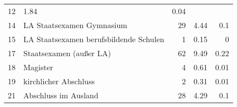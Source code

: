 \begin{longtable}{lXrrr}
       \num{12} &
       \num[round-mode=places,round-precision=2]{1.84} &
         \num[round-mode=places,round-precision=2]{0.04} \\

     14 &
     \multicolumn{1}{X}{ LA Staatsexamen Gymnasium   } &


       \num{29} &
       \num[round-mode=places,round-precision=2]{4.44} &
         \num[round-mode=places,round-precision=2]{0.1} \\

     15 &
     \multicolumn{1}{X}{ LA Staatsexamen berufsbildende Schulen   } &


       \num{1} &
       \num[round-mode=places,round-precision=2]{0.15} &
         \num[round-mode=places,round-precision=2]{0} \\

     17 &
     \multicolumn{1}{X}{ Staatsexamen (außer LA)   } &


       \num{62} &
       \num[round-mode=places,round-precision=2]{9.49} &
         \num[round-mode=places,round-precision=2]{0.22} \\

     18 &
     \multicolumn{1}{X}{ Magister   } &


       \num{4} &
       \num[round-mode=places,round-precision=2]{0.61} &
         \num[round-mode=places,round-precision=2]{0.01} \\

     19 &
     \multicolumn{1}{X}{ kirchlicher Abschluss   } &


       \num{2} &
       \num[round-mode=places,round-precision=2]{0.31} &
         \num[round-mode=places,round-precision=2]{0.01} \\

     21 &
     \multicolumn{1}{X}{ Abschluss im Ausland   } &


       \num{28} &
       \num[round-mode=places,round-precision=2]{4.29} &
         \num[round-mode=places,round-precision=2]{0.1} \\


\end{longtable}
